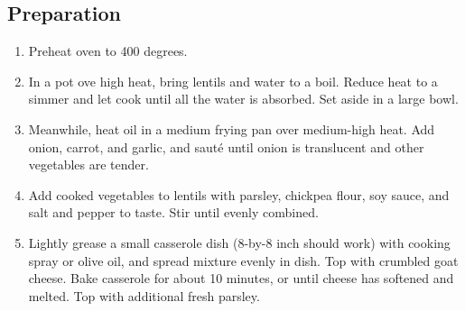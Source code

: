 \subsection{Preparation}
\begin{enumerate}
    \item Preheat oven to 400 degrees.
    \item In a pot ove high heat, bring lentils and water to a boil. Reduce heat to a simmer and let cook until all the water is absorbed. Set aside in a large bowl.
    \item Meanwhile, heat oil in a medium frying pan over medium-high heat. Add onion, carrot, and garlic, and sauté until onion is translucent and other vegetables are tender.
    \item Add cooked vegetables to lentils with parsley, chickpea flour, soy sauce, and salt and pepper to taste. Stir until evenly combined.
    \item Lightly grease a small casserole dish (8-by-8 inch should work) with cooking spray or olive oil, and spread mixture evenly in dish. Top with crumbled goat cheese. Bake casserole for about 10 minutes, or until cheese has softened and melted. Top with additional fresh parsley.
\end{enumerate}

